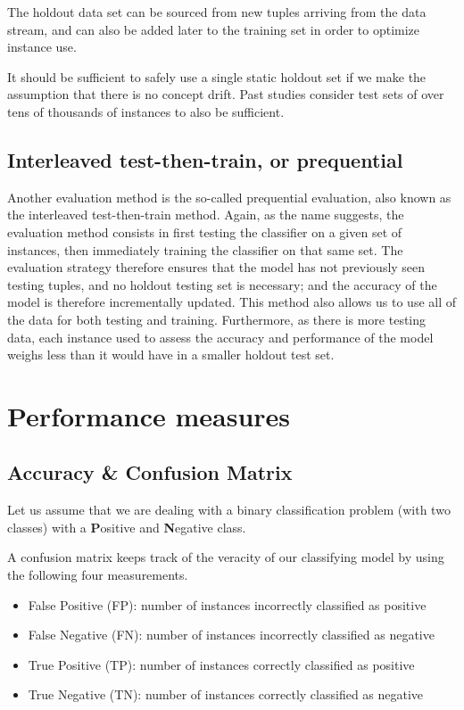 The holdout data set can be sourced from new tuples arriving from the data stream, and can also be added later to the training set in order to optimize instance use.

It should be sufficient to safely use a single static holdout set if we make the assumption that there is no concept drift. Past studies consider test sets of over tens of thousands of instances to also be sufficient. 
\subsection{Interleaved test-then-train, or prequential}
Another evaluation method is the so-called prequential evaluation, also known as the interleaved test-then-train method. Again, as the name suggests, the evaluation method consists in first testing the classifier on a given set of instances, then immediately training the classifier on that same set. The evaluation strategy therefore ensures that the model has not previously seen testing tuples, and no holdout testing set is necessary; and the accuracy of the model is therefore incrementally updated. This method also allows us to use all of the data for both testing and training. Furthermore, as there is more testing data, each instance used to assess the accuracy and performance of the model weighs less than it would have in a smaller holdout test set.

\section{Performance measures}


\subsection{Accuracy \& Confusion Matrix}
Let us assume that we are dealing with a binary classification problem (with two classes) with a \textbf{P}ositive and \textbf{N}egative class.

A confusion matrix keeps track of the veracity of our classifying model by using the following four measurements.

\begin{itemize}
\item False Positive (FP): number of instances incorrectly classified as positive
\item False Negative (FN): number of instances incorrectly classified as negative
\item True Positive (TP): number of instances correctly classified as positive
\item True Negative (TN): number of instances correctly classified as negative
\end{itemize}

